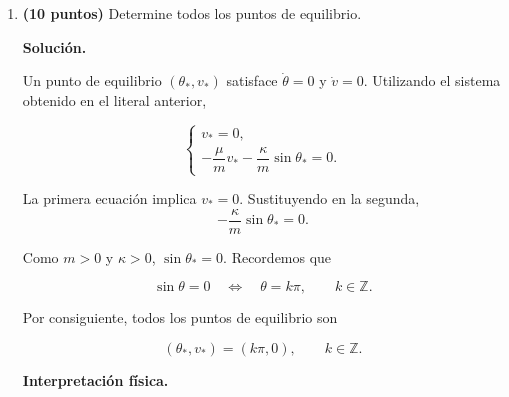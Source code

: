 \documentclass[a4paper,12pt]{article}
\newcommand{\solucion}{
\par\medskip
{\color{solutioncolor}\textbf{Solución.}}
\par
}
\begin{document}
\begin{enumerate}[leftmargin=*,
itemsep=0.8cm]
\begin{enumerate}[label=\alph*),
leftmargin=*,itemsep=0.5cm]
Por tanto, el sistema equivalente
de primer orden es

\[
\boxed{
\begin{aligned}
\dot{\theta}&=v,\\
\dot{v}&=
-\frac{\mu}{m}v
-\frac{\kappa}{m}\sin\theta.
\end{aligned}
}
\]

El estado del sistema queda
determinado por el vector

\[
\mathbf X(t)=
\begin{pmatrix}
\theta(t)\\v(t)
\end{pmatrix}.
\]

En particular, el sistema puede
escribirse como

\[
\dot{\mathbf X}=F(\mathbf X),
\]

donde

\[
F(\theta,v)=
\begin{pmatrix}
v\\[2mm]
-\dfrac{\mu}{m}v
-\dfrac{\kappa}{m}\sin\theta
\end{pmatrix}.
\]

Así, una ecuación diferencial
de segundo orden se transforma
en un sistema de dos ecuaciones
diferenciales de primer orden.

\item \textbf{(10 puntos)}
Determine todos los puntos
de equilibrio.

\solucion

Un punto de equilibrio
$(\theta_*,v_*)$ satisface $\dot{\theta}=0$ y $\dot v=0$. Utilizando el sistema obtenido
en el literal anterior,

\[
\begin{cases}
v_*=0,\\[2mm]
-\dfrac{\mu}{m}v_*
-\dfrac{\kappa}{m}
\sin\theta_*=0.
\end{cases}
\]

La primera ecuación implica $v_*=0$. Sustituyendo en la segunda,
\[
-\frac{\kappa}{m}
\sin\theta_*=0.
\]

Como $m>0$ y $\kappa>0$, $\sin\theta_*=0$. Recordemos que

\[
\sin\theta=0
\quad\Longleftrightarrow\quad
\theta=k\pi,
\qquad k\in\mathbb Z.
\]

Por consiguiente, todos
los puntos de equilibrio son

\[
\boxed{
(\theta_*,v_*)=(k\pi,0),
\qquad k\in\mathbb Z.
}
\]

\textbf{Interpretación física.}


\end{enumerate}
\end{enumerate}
\end{document}
